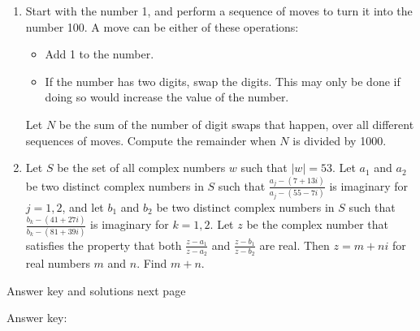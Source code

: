 \documentclass{article}
\begin{document}
\begin{enumerate}
\item Start with the number 1, and perform a sequence of moves to turn it into the number 100. A move can be either of these operations:

\begin{itemize}
    \item Add 1 to the number.
    \item If the number has two digits, swap the digits. This may only be done if doing so would increase the value of the number.
\end{itemize}

Let $N$ be the sum of the number of digit swaps that happen, over all different sequences of moves. Compute the remainder when $N$ is divided by 1000. 

\item Let $S$ be the set of all complex numbers $w$ such that $|w|=53$. Let $a_1$ and $a_2$ be two distinct complex numbers in $S$ such that $ \displaystyle \frac{a_j-(7+13i)}{a_j-(55-7i)} $ is imaginary for $j=1,2$, and let $b_1$ and $b_2$ be two distinct complex numbers in $S$ such that $ \displaystyle \frac{b_k-(41+27i)}{b_k-(81+39i)} $  is imaginary for $k=1,2$. Let $z$ be the complex number that satisfies the property that both $\displaystyle \frac{z-a_1}{z-a_2}$ and $\displaystyle \frac{z-b_1}{z-b_2}$ are real. Then $z=m+ni$ for real numbers $m$ and $n$. Find $m+n$.

\end{enumerate}





\newpage

\;

\newpage

Answer key and solutions next page

\newpage



Answer key:

\end{document}
